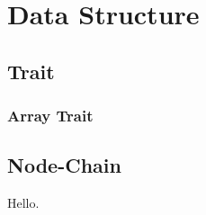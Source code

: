 
\section{Data Structure}

\subsection{Trait}

\subsubsection{Array Trait}

\subsection{Node-Chain}


Hello.